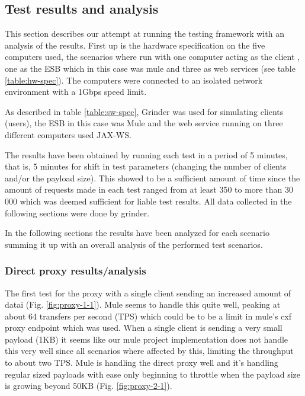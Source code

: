 \subsection{Test results and analysis}

This section describes our attempt at running the testing framework with an analysis of the results.
First up is the hardware specification on the five computers used, the scenarios where run with one computer acting as the client , one as the ESB which in this case was mule  and three as web services (see table \ref{table:hw-spec}). 
The computers were connected to an isolated network environment with a 1Gbps speed limit.

As described in table \ref{table:sw-spec}, Grinder was used for simulating clients (users), the ESB in this case was Mule and the web service running on three different computers used JAX-WS.

The results have been obtained by running each test in a period of 5 minutes, that is, 5 minutes for shift in test parameters (changing the number of clients and/or the payload size). 
This showed to be a sufficient amount of time since the amount of requests made in each test ranged from at least 350 to more than 30 000 which was deemed sufficient for liable test results. All data collected in the following sections were done by grinder.

In the following sections the results have been analyzed for each scenario summing it up with an overall analysis of the performed test scenarios.

\subsubsection{Direct proxy results/analysis}
\label{test:results}
The first test for the proxy with a single client sending an increased amount of datai (Fig. \ref{fig:proxy-1-1}). Mule seems to handle this quite well, peaking at about 64 transfers per second (TPS) which could be to be a limit in mule's cxf proxy endpoint which was used. When a single client is sending a very small payload (1KB) it seems like our mule project implementation does not handle this very well since all scenarios where affected by this, limiting the throughput to about two TPS. Mule is handling the direct proxy well and it's handling regular sized payloads with ease only beginning to throttle when the payload size is growing beyond 50KB (Fig. \ref{fig:proxy-2-1}).

